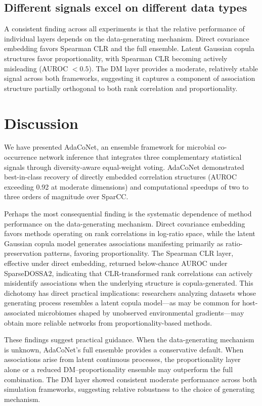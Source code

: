 \documentclass[fleqn]{nature}
\begin{document}
\subsection*{Different signals excel on different data types}

A consistent finding across all experiments is that the relative performance of individual layers depends on the data-generating mechanism.
Direct covariance embedding favors Spearman CLR and the full ensemble.
Latent Gaussian copula structures favor proportionality, with Spearman CLR becoming actively misleading (AUROC $< 0.5$).
The DM layer provides a moderate, relatively stable signal across both frameworks, suggesting it captures a component of association structure partially orthogonal to both rank correlation and proportionality.


\section*{Discussion}

We have presented AdaCoNet, an ensemble framework for microbial co-occurrence network inference that integrates three complementary statistical signals through diversity-aware equal-weight voting.
AdaCoNet demonstrated best-in-class recovery of directly embedded correlation structures (AUROC exceeding 0.92 at moderate dimensions) and computational speedups of two to three orders of magnitude over SparCC.

Perhaps the most consequential finding is the systematic dependence of method performance on the data-generating mechanism.
Direct covariance embedding favors methods operating on rank correlations in log-ratio space, while the latent Gaussian copula model generates associations manifesting primarily as ratio-preservation patterns, favoring proportionality.
The Spearman CLR layer, effective under direct embedding, returned below-chance AUROC under SparseDOSSA2, indicating that CLR-transformed rank correlations can actively misidentify associations when the underlying structure is copula-generated.
This dichotomy has direct practical implications: researchers analyzing datasets whose generating process resembles a latent copula model---as may be common for host-associated microbiomes shaped by unobserved environmental gradients---may obtain more reliable networks from proportionality-based methods.

These findings suggest practical guidance.
When the data-generating mechanism is unknown, AdaCoNet's full ensemble provides a conservative default.
When associations arise from latent continuous processes, the proportionality layer alone or a reduced DM--proportionality ensemble may outperform the full combination.
The DM layer showed consistent moderate performance across both simulation frameworks, suggesting relative robustness to the choice of generating mechanism.
\end{document}
